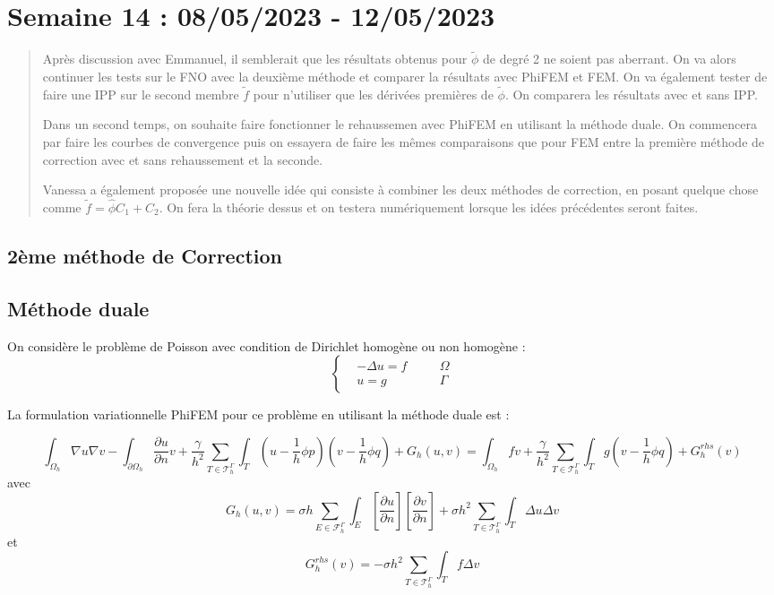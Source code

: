 \section{Semaine 14 : 08/05/2023 - 12/05/2023}
\graphicspath{{semaines/semaine_14/images/}}

\begin{abstract}
	Après discussion avec Emmanuel, il semblerait que les résultats obtenus pour $\tilde{\phi}$ de degré 2 ne soient pas aberrant. On va alors continuer les tests sur le FNO avec la deuxième méthode et comparer la résultats avec PhiFEM et FEM.  On va également tester de faire une IPP sur le second membre $\tilde{f}$ pour n'utiliser que les dérivées premières de $\tilde{\phi}$. On comparera les résultats avec et sans IPP.

	Dans un second temps, on souhaite faire fonctionner le rehaussemen avec PhiFEM en utilisant la méthode duale. On commencera par faire les courbes de convergence puis on essayera de faire les mêmes comparaisons que pour FEM entre la première méthode de correction avec et sans rehaussement et la seconde.
	
	Vanessa a également proposée une nouvelle idée qui consiste à combiner les deux méthodes de correction, en posant quelque chose comme $\tilde{f}=\hat{\phi}C_1+C_2$. On fera la théorie dessus et on testera numériquement lorsque les idées précédentes seront faites.
\end{abstract}

\subsection{2ème méthode de Correction}

\subsection{Méthode duale}

On considère le problème de Poisson avec condition de Dirichlet homogène ou non homogène :
\begin{equation*}
	\left\{\begin{aligned}
		&-\Delta u=f \quad &&\Omega \\
		&u=g \quad &&\Gamma
	\end{aligned}\right.
\end{equation*}

La formulation variationnelle PhiFEM pour ce problème en utilisant la méthode duale est :

$$\int_{\Omega_h}\nabla u\nabla v-\int_{\partial\Omega_h}\frac{\partial u}{\partial n} v + \frac{\gamma}{h^2} \sum_{T\in\mathcal{T}_h^\Gamma}\int_T \left(u-\frac{1}{h}\phi p\right)\left(v-\frac{1}{h}\phi q\right) + G_h(u,v) = \int_{\Omega_h}fv + \frac{\gamma}{h^2} \sum_{T\in\mathcal{T}_h^\Gamma}\int_T g\left(v-\frac{1}{h}\phi q\right) + G_h^{rhs}(v)$$
avec
$$G_h(u,v)=\sigma h\sum_{E\in\mathcal{F}_h^\Gamma}\int_E\left[\frac{\partial u}{\partial n}\right]\left[\frac{\partial v}{\partial n}\right]+\sigma h^2\sum_{T\in\mathcal{T}_h^\Gamma}\int_T \Delta u\Delta v$$
et
$$G_h^{rhs}(v)=-\sigma h^2\sum_{T\in\mathcal{T}_h^\Gamma}\int_T f\Delta v$$

